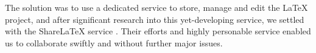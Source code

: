 The solution was to use a dedicated service to store, manage and edit the LaTeX project, and after significant research into this yet-developing service, we settled with the ShareLaTeX service \cite{sharedurex}. Their efforts and highly personable service enabled us to collaborate swiftly and without further major issues. \\

